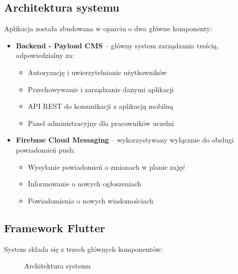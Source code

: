 \subsection{Architektura systemu}

Aplikacja została zbudowana w oparciu o dwa główne komponenty:

\begin{itemize}
  \item \textbf{Backend - Payload CMS} – główny system zarządzania treścią, odpowiedzialny za:
        \begin{itemize}
          \item Autoryzację i uwierzytelnianie użytkowników
          \item Przechowywanie i zarządzanie danymi aplikacji
          \item API REST do komunikacji z aplikacją mobilną
          \item Panel administracyjny dla pracowników uczelni
        \end{itemize}

  \item \textbf{Firebase Cloud Messaging} – wykorzystywany wyłącznie do obsługi powiadomień push:
        \begin{itemize}
          \item Wysyłanie powiadomień o zmianach w planie zajęć
          \item Informowanie o nowych ogłoszeniach
          \item Powiadomienia o nowych wiadomościach
        \end{itemize}
\end{itemize}

\subsection{Framework Flutter}
System składa się z trzech głównych komponentów:

\begin{figure}[h]
  \centering
  \caption{Architektura systemu}
  \label{fig:architecture}
\end{figure}
\newpage
